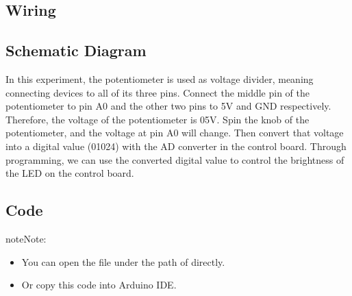 \documentclass[a4paper,11pt,english]{sphinxmanual}
\begin{document}
\subsection{Wiring}
\label{\detokenize{Basic_Project/Potentiometer:wiring}}


\subsection{Schematic Diagram}
\label{\detokenize{Basic_Project/Potentiometer:schematic-diagram}}
\sphinxAtStartPar
In this experiment, the potentiometer is used as voltage divider, meaning connecting devices to all of its three pins. Connect the middle pin of the potentiometer to pin A0 and the other two pins to 5V and GND respectively. Therefore, the voltage of the potentiometer is 0\sphinxhyphen{}5V. Spin the knob of the potentiometer, and the voltage at pin A0 will change. Then convert that voltage into a digital value (0\sphinxhyphen{}1024) with the AD converter in the control board. Through programming, we can use the converted digital value to control the brightness of the LED on the
control board.



\subsection{Code}
\label{\detokenize{Basic_Project/Potentiometer:code}}
\begin{sphinxadmonition}{note}{Note:}\begin{itemize}
\item {} 
\sphinxAtStartPar
You can open the file  under the path of  directly.

\item {} 
\sphinxAtStartPar
Or copy this code into Arduino IDE.

\end{itemize}
\end{sphinxadmonition}
\end{document}
